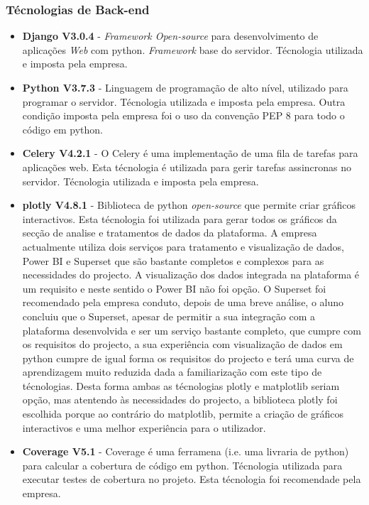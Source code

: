 \subsubsection{Técnologias de Back-end}
\begin{itemize}
	\item \textbf{Django V3.0.4} - \textit{Framework Open-source} para desenvolvimento de aplicações \textit{Web} com python. \textit{Framework} base do servidor. Técnologia utilizada e imposta pela empresa.
	\item \textbf{Python V3.7.3} - Linguagem de programação de alto nível, utilizado para programar o servidor. Técnologia utilizada e imposta pela empresa. Outra condição imposta pela empresa foi o uso da convenção PEP 8\cite{convencao} para todo o código em python.
	\item \textbf{Celery V4.2.1} - O Celery é uma implementação de uma fila de tarefas para aplicações web. Esta técnologia é utilizada para gerir tarefas assincronas no servidor. Técnologia utilizada e imposta pela empresa.
	\item \textbf{plotly V4.8.1} - Biblioteca de python \textit{open-source} que permite criar gráficos interactivos. Esta técnologia foi utilizada para gerar todos os gráficos da secção de analise e tratamentos de dados da plataforma. A empresa actualmente utiliza dois serviços para tratamento e visualização de dados, Power BI\cite{pb} e Superset\cite{bb} que são bastante completos e complexos para  as necessidades do projecto. A visualização dos dados integrada na plataforma é um requisito e neste sentido o Power BI não foi opção. O Superset foi recomendado pela empresa conduto, depois de uma breve análise, o aluno concluiu que o Superset, apesar de permitir a sua integração com a plataforma desenvolvida e ser um serviço bastante completo, que cumpre com os requisitos do projecto, a sua experiência com visualização de dados em python cumpre de igual forma os requisitos do projecto e terá uma curva de aprendizagem muito reduzida dada a familiarização com este tipo de técnologias. 
	Desta forma ambas as técnologias plotly e matplotlib\cite{mpl} seriam opção, mas atentendo às necessidades do projecto, a biblioteca plotly foi escolhida porque ao contrário do matplotlib, permite a criação de gráficos interactivos e uma melhor experiência para o utilizador.
	\item \textbf{Coverage V5.1} - Coverage é uma ferramena (i.e. uma livraria de python) para calcular a cobertura de código em python. Técnologia utilizada para executar testes de cobertura no projeto. Esta técnologia foi recomendade pela empresa.
\end{itemize}

